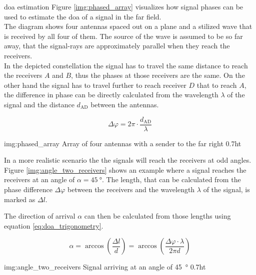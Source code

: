 \begin{subchapter}{\gls{doa} estimation}
  Figure \ref{img:phased_array} visualizes how signal phases
  can be used to estimate the \acrlong{doa} of a signal
  in the far field. \\

  The diagram shows four antennas spaced out on a plane
  and a stilized wave that is received by all four of them.
  The source of the wave is assumed to be so far away, that
  the signal-rays are approximately parallel when
  they reach the receivers. \\

  In the depicted constellation the signal has to travel the
  same distance to reach the receivers $A$ and $B$, thus the
  phases at those receivers are the same.
  On the other hand the signal has to travel further to reach
  receiver $D$ that to reach $A$, the difference in phase can
  be directly calculated from the wavelength $\lambda$ of the
  signal and the distance $d_\text{AD}$ between the antennas.

  \begin{equation*}
    \Delta \varphi =  2 \pi \cdot \frac{d_\text{AD}}{\lambda}
  \end{equation*}

               {img:phased_array}
               {Array of four antennas with a sender to the far right}
               {0.7}{ht}

  In a more realistic scenario the the signals will reach the
  receivers at odd angles. Figure \ref{img:angle_two_receivers}
  shows an example where a signal reaches the receivers at an
  angle of $\alpha=\SI{45}{\degree}$. The length, that can be calculated
  from the phase difference $\Delta \varphi$ between the receivers and
  the wavelength $\lambda$ of the signal, is marked as $\Delta l$.

  The direction of arrival $\alpha$ can then be calculated from
  those lengths using equation \ref{eq:doa_trigonometry}.

  \begin{equation}
    \label{eq:doa_trigonometry}
    \alpha
    = \arccos \left( \frac{\Delta l}{d} \right)
    = \arccos \left( \frac{\Delta \varphi \cdot \lambda}{2 \pi d} \right)
  \end{equation}

               {img:angle_two_receivers}
               {Signal arriving at an angle of \SI{45}{\degree}}
               {0.7}{ht}
\end{subchapter}

